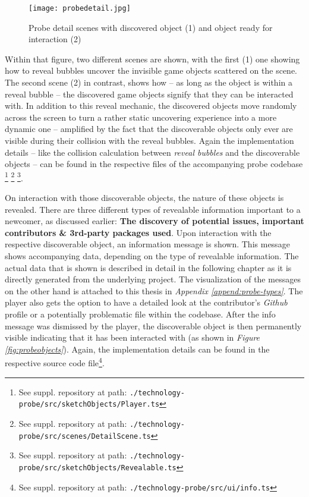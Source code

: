 \begin{figure}[h]
  \centering
  \texttt{[image: probedetail.jpg]}
  \caption{Probe detail scenes with discovered object (1) and object ready for interaction (2)}
  \label{fig:probedetail}
\end{figure}

Within that figure, two different scenes are shown, with the first (1) one showing how to reveal bubbles uncover the invisible game objects scattered on the scene. The second scene (2) in contrast, shows how -- as long as the object is within a reveal bubble -- the discovered game objects signify that they can be interacted with. In addition to this reveal mechanic, the discovered objects move randomly across the screen to turn a rather static uncovering experience into a more dynamic one -- amplified by the fact that the discoverable objects only ever are visible during their collision with the reveal bubbles. Again the implementation details -- like the collision calculation between \textit{reveal bubbles} and the discoverable objects -- can be found in the respective files of the accompanying probe codebase \footnote{See suppl. repository at path: \texttt{./technology-probe/src/sketchObjects/Player.ts}} \footnote{See suppl. repository at path: \texttt{./technology-probe/src/scenes/DetailScene.ts}} \footnote{See suppl. repository at path: \texttt{./technology-probe/src/sketchObjects/Revealable.ts}}.

On interaction with those discoverable objects, the nature of these objects is revealed. There are three different types of revealable information important to a newcomer, as discussed earlier: \textbf{The discovery of potential issues, important contributors \& 3rd-party packages used}. Upon interaction with the respective discoverable object, an information message is shown. This message shows accompanying data, depending on the type of revealable information. The actual data that is shown is described in detail in the following chapter as it is directly generated from the underlying project. The visualization of the messages on the other hand is attached to this thesis in \textit{Appendix \ref{append:probe-types}}. The player also gets the option to have a detailed look at the contributor's \textit{Github} profile or a potentially problematic file within the codebase. After the info message was dismissed by the player, the discoverable object is then permanently visible indicating that it has been interacted with (as shown in \textit{Figure \ref{fig:probeobjects}}). Again, the implementation details can be found in the respective source code file\footnote{See suppl. repository at path: \texttt{./technology-probe/src/ui/info.ts}}.

